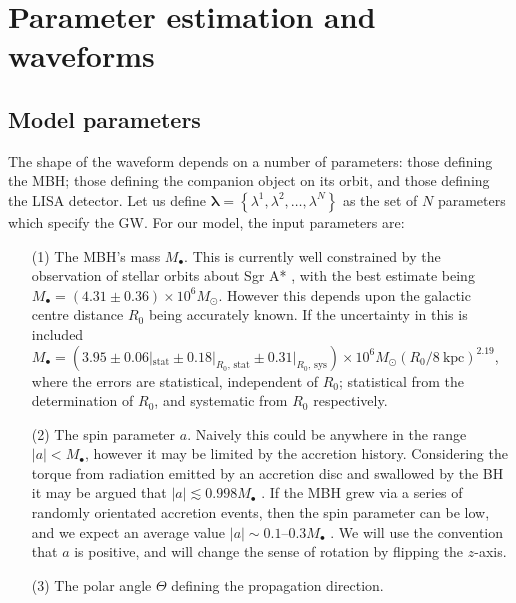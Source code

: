 \documentclass[useAMS,usedcolumn,usegraphicx,usenatbib]{mn2e}
\newcommand{\units}[1]{\ensuremath{~\mathrm{#1}}}
\newcommand{\sub}[1]{\ensuremath{_\mathrm{#1}}}
\begin{document}
\section{Parameter estimation and waveforms}

\subsection{Model parameters}\label{sec:Parameters}

The shape of the waveform depends on a number of parameters: those defining the MBH; those defining the companion object on its orbit, and those defining the LISA detector. Let us define $\boldsymbol{\lambda} = \left\{\lambda^1, \lambda^2, \ldots, \lambda^N\right\}$ as the set of $N$ parameters which specify the GW. For our model, the input parameters are:
\begin{enumerate}%
\item[(1)] The MBH's mass $M_\bullet$. This is currently well constrained by the observation of stellar orbits about Sgr A* \citep{Ghez2008, Gillessen2009}, with the best estimate being $M_\bullet = (4.31 \pm 0.36) \times 10^6 M_\odot$. However this depends upon the galactic centre distance $R_0$ being accurately known. If the uncertainty in this is included $M_\bullet = (3.95 \pm 0.06|\sub{stat} \pm 0.18|_{R_0, \, \mathrm{stat}} \pm  0.31|_{R_0, \, \mathrm{sys}}) \times 10^6 M_\odot (R_0 / 8\units{kpc})^{2.19}$, where the errors are statistical, independent of $R_0$; statistical from the determination of $R_0$, and systematic from $R_0$ respectively.
\item[(2)] The spin parameter $a$. Naively this could be anywhere in the range $|a| < M_\bullet$, however it may be limited by the accretion history. Considering the torque from radiation emitted by an accretion disc and swallowed by the BH it may be argued that $|a| \lesssim 0.998 M_\bullet$ \citep{Thorne1974}. If the MBH grew via a series of randomly orientated accretion events, then the spin parameter can be low, and we expect an average value $|a| \sim 0.1$--$0.3 M_\bullet$ \citep{King2006, King2008}. We will use the convention that $a$ is positive, and will change the sense of rotation by flipping the $z$-axis.
\item[(3)] The polar angle $\Theta$ defining the propagation direction.

\end{enumerate}
\end{document}
